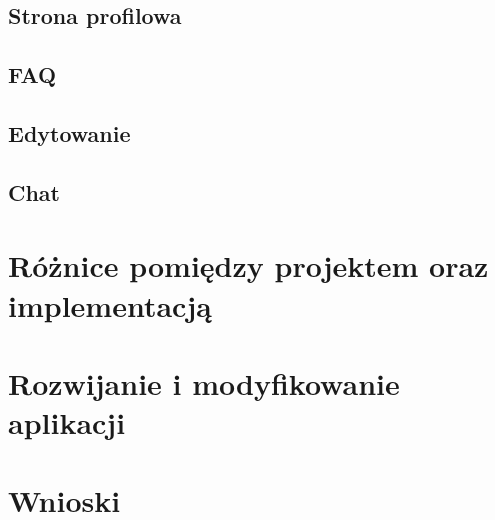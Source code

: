 \subsection{Strona profilowa}
\label{sec:my_page}

\subsection{FAQ}
\label{sec:faq}

\subsection{Edytowanie}
\label{sec:edit}

\subsection{Chat}
\label{sec:chat}



\section{Różnice pomiędzy projektem oraz implementacją}
\label{sec:roznice}



\section{Rozwijanie i modyfikowanie aplikacji}
\label{sec:rozwoj}



\section{Wnioski}
\label{sec:doswiadczenia}

